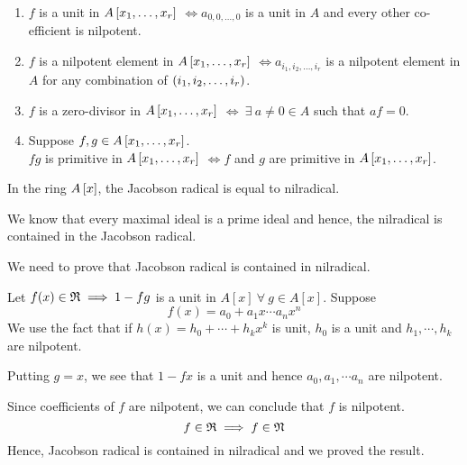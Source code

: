 \begin{enumerate}
	\item \( f \) is a unit in \( A \left[ x_1, \ldots, x_r \right] \)
	\( \iff a_{0, 0, \ldots, 0} \) is a unit in \( A \) and
	every other co-efficient is nilpotent.

	\item \( f \) is a nilpotent element in \( A \left[ x_1, \ldots, x_r \right] \)
	\( \iff a_{i_1, i_2, \ldots, i_r} \) is a nilpotent element in \( A \)
	for any combination of \( \left( i_1, i_2, \ldots, i_r \right) \).

	\item \( f \) is a zero-divisor in \( A \left[ x_1, \ldots, x_r \right] \)
	\( \iff \ \exists\ a \neq 0 \in A \) such that \( a f = 0 \).

	\item Suppose \( f, g \in A \left[ x_1, \ldots, x_r \right] \). \\
	\( fg \) is primitive in \( A \left[ x_1, \ldots, x_r \right] \)
	\( \iff f \) and \( g \) are primitive in \( A \left[ x_1, \ldots, x_r \right] \).
\end{enumerate}



\begin{exercise}{}{}
	In the ring \( A \left[ x \right] \), the Jacobson radical is equal to
	nilradical.
\end{exercise}

We know that every maximal ideal is a prime ideal and hence, the nilradical
is contained in the Jacobson radical.

We need to prove that Jacobson radical is contained in nilradical.

Let \( f(x) \in \mathfrak{R} \implies 1 - fg \) is a unit in \( A[x] \ \forall\
g \in A[x] \).
Suppose
\[
	f(x) = a_0 + a_1 x \cdots a_n x^n
\]
We use the fact that if \( h(x) = h_0 + \cdots + h_k x^k \) is unit,
\( h_0 \) is a unit and \( h_1, \cdots, h_k \) are nilpotent.

Putting \( g = x \), we see that \( 1 - fx \) is a unit and hence
\( a_0, a_1, \cdots a_n \) are nilpotent.

Since coefficients of \( f \) are nilpotent, we can conclude
that \( f \) is nilpotent.
\[
	f \in \mathfrak{R} \implies f \in \mathfrak{N}
\]
Hence, Jacobson radical is contained in nilradical and we proved the result.


